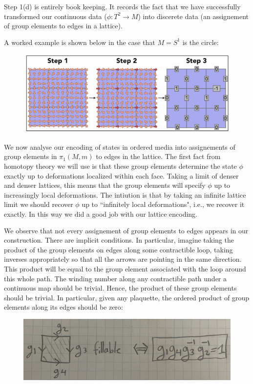 \documentclass{article}
\theoremstyle{definition}
\numberwithin{figure}{section}
\begin{document}
Step 1(d) is entirely book keeping. It records the fact that we have successfully transformed our continuous data ($\phi:T^2\to M$) into discerete data (an assignement of group elements to edges in a lattice).

A worked example is shown below in the case that $M=S^1$ is the circle:

\begin{figure}[h]
\begin{center}
\includegraphics[scale=.3]{full-example}
\end{center}
\end{figure}

We now analyse our encoding of states in ordered media into assignements of group elements in $\pi_1(M,m)$ to edges in the lattice. The first fact from homotopy theory we will use is that these group elements determine the state $\phi$ exactly up to deformations localized within each face. Taking a limit of denser and denser lattices, this means that the group elements will specify $\phi$ up to increasingly local deformations. The intiution is that by taking an infinite lattice limit we should recover $\phi$ up to ``infinitely local deformations", i.e., we recover it exactly. In this way we did a good job with our lattice encoding.

We observe that not every assignement of group elements to edges appears in our construction. There are implicit conditions. In particular, imagine taking the product of the group elements on edges along some contractible loop, taking inverses appropriately so that all the arrows are pointing in the same direction. This product will be equal to the group element associated with the loop around this whole path. The winding number along any contractible path under a continuous map should be trivial. Hence, the product of these group elements should be trivial. In particular, given any plaquette, the ordered product of group elements along its edges should be zero:

\begin{figure}[h]
\begin{center}
\includegraphics[scale=.06]{plaquette-rule}
\end{center}
\end{figure}
\end{document}
